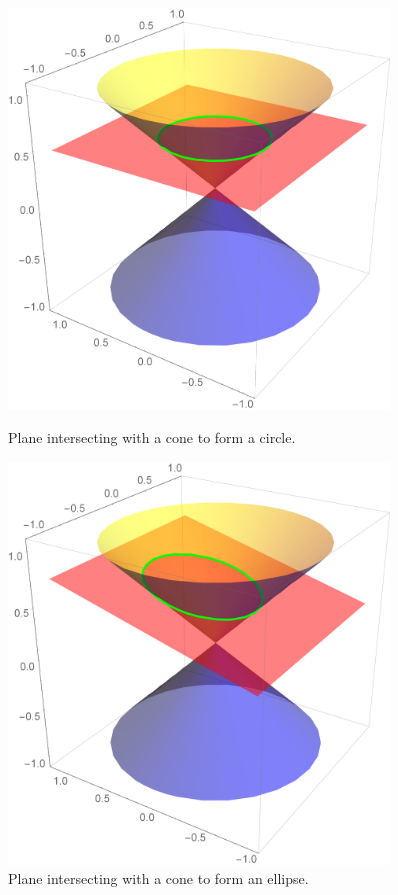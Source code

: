 \documentclass[letterpaper, 11pt, openany]{book}
\theoremstyle{mytheoremstyle}
\theoremstyle{myexamplestyle}
\begin{document}
\begin{figure}[htbp]
    \centering
    \begin{minipage}{0.45\textwidth}
        \centering
        \includegraphics[width=0.9\textwidth]{Figures/coniccircle.png}
        \caption{Plane intersecting with a cone to form a circle.}
        \label{f:coniccircle}
    \end{minipage}\hfill
    \begin{minipage}{0.45\textwidth}
        \centering
        \includegraphics[width=0.9\textwidth]{Figures/conicellipse.png}
        \caption{Plane intersecting with a cone to form an ellipse.}
        \label{f:conicellipse}
    \end{minipage}\hfill
\end{figure}
\end{document}
